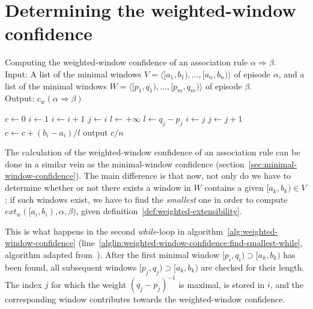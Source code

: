\section{Determining the weighted-window confidence}
\label{sec:weighted-window-confidence}

\begin{algorithm}

\caption{Computing the weighted-window confidence of an association rule $ \alpha \Rightarrow \beta $.\\
Input: A list of the minimal windows $ V = \langle [a_1, b_1), \ldots, [a_n, b_n) \rangle $ of episode $ \alpha $, and a list of the minimal windows $ W = \langle [p_1, q_1), \ldots, [p_m, q_m) \rangle $ of episode $ \beta $.\\
Output: $ c_w(\alpha \Rightarrow \beta) $
}

\begin{algorithmic}[1]

\State $ c \gets 0 $
\State $ i \gets 1 $
        \State $ i \gets i + 1 $
    \EndWhile
    \State $ j \gets i $
    \State $ l \gets +\infty $
     \label{alglin:weighted-window-confidence:find-smallest-while}
            \State $ l \gets q_j - p_j $
            \State $ i \gets j $
        \EndIf
        \State $ j \gets j + 1 $
    \EndWhile
        \State $ c \gets c + (b_i - a_i) / l $
    \EndIf
\EndFor
\State output $ c / n $

\end{algorithmic}

\label{alg:weighted-window-confidence}
\end{algorithm}

The calculation of the weighted-window confidence of an association rule can be done in a similar vein as the minimal-window confidence (section~\ref{sec:minimal-window-confidence}). The main difference is that now, not only do we have to determine whether or not there exists a window in $ W $ contains a given $ [a_k, b_k) \in V $; if such windows exist, we have to find the \emph{smallest} one in order to compute $ ext_w([a_i, b_i), \alpha, \beta) $, given definition~\ref{def:weighted-extensibility}.

This is what happens in the second \emph{while}-loop in algorithm~\ref{alg:weighted-window-confidence} (line~\ref{alglin:weighted-window-confidence:find-smallest-while}, algorithm adapted from~\cite{cule2014marbles}). After the first minimal window $ [p_i, q_i) \supset [a_k, b_k) $ has been found, all subsequent windows $ [p_j, q_j) \supset [a_k, b_k) $ are checked for their length. The index $ j $ for which the weight $ (q_j - p_j)^{-1} $ is maximal, is stored in $ i $, and the corresponding window contributes towards the weighted-window confidence.

